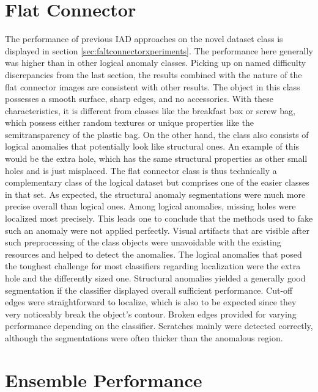 \section{Flat Connector}
\label{sec:flatconnectordiscussion}

The performance of previous IAD approaches on the novel dataset class is displayed in section \ref{sec:faltconnectorxperiments}. The performance here generally was higher 
than in other logical anomaly classes. Picking up on named difficulty discrepancies from the last section, the results combined with the nature of the flat connector images 
are consistent with other results. The object in this class possesses a smooth surface, sharp edges, and no accessories. With these 
characteristics, it is different from classes like the breakfast box or screw bag, which possess either random textures or unique properties 
like the semitransparency of the plastic bag. On the other hand, the class also consists of logical anomalies that potentially look 
like structural ones. An example of this would be the extra hole, which has the same structural properties as other small holes and is 
just misplaced. The flat connector class is thus technically a complementary class of the logical dataset but comprises 
one of the easier classes in that set. \newline
As expected, the structural anomaly segmentations were much more precise overall than logical ones. Among logical anomalies, 
missing holes were localized most precisely. This leads one to conclude that the methods used to fake such an anomaly were not applied perfectly. 
Visual artifacts that are visible after such preprocessing of the class objects were unavoidable with the existing resources and  
helped to detect the anomalies. The logical anomalies that posed the toughest challenge for most classifiers regarding localization 
were the extra hole and the differently sized one. Structural anomalies yielded a generally good segmentation if the classifier displayed overall sufficient performance. Cut-off edges were straightforward to localize, which is also to be expected since they very noticeably break the object's contour. Broken edges provided for 
varying performance depending on the classifier. Scratches mainly were detected correctly, although the segmentations were often 
thicker than the anomalous region.



\section{Ensemble Performance}
\label{sec:ensemblediscussion}

